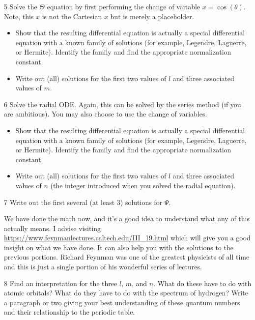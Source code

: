 \documentclass{article}
\begin{document}
\begin{problem}{}{5}
Solve the $\Theta$ equation by first performing the change of variable $x=\cos(\theta)$. Note, this $x$ is not the Cartesian $x$ but is merely a placeholder.  
\begin{itemize}
    \item Show that the resulting differential equation is actually a special differential equation with a known family of solutions (for example, Legendre, Laguerre, or Hermite). Identify the family and find the appropriate normalization constant.
    \item Write out (all) solutions for the first two values of $l$ and three associated values of $m$.
\end{itemize}
\end{problem}

\begin{problem}{}{6}
Solve the radial ODE. Again, this can be solved by the series method (if you are ambitious).  You may also choose to use the change of variables.
\begin{itemize}
    \item Show that the resulting differential equation is actually a special differential equation with a known family of solutions (for example, Legendre, Laguerre, or Hermite). Identify the family and find the appropriate normalization constant.
    \item Write out (all) solutions for the first two values of $l$ and three associated values of $n$ (the integer introduced when you solved the radial equation).  
\end{itemize}
\end{problem}

\begin{problem}{}{7}
Write out the first several (at least 3) solutions for $\Psi$.
\end{problem}

\noindent We have done the math now, and it's a good idea to understand what any of this actually means.  I advise visiting \url{https://www.feynmanlectures.caltech.edu/III_19.html} which will give you a good insight on what we have done.  It can also help you with the solutions to the previous portions.  Richard Feynman was one of the greatest physicists of all time and this is just a single portion of his wonderful series of lectures.

\begin{problem}{}{8}
Find an interpretation for the three  $l$, $m$, and $n$.  What do these have to do with atomic orbitals? What do they have to do with the spectrum of hydrogen? Write a paragraph or two giving your best understanding of these quantum numbers and their relationship to the periodic table.
\end{problem}
\end{document}
